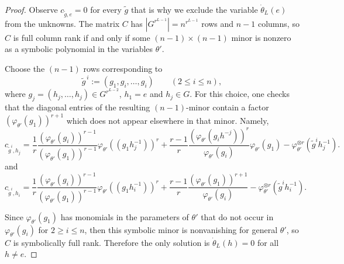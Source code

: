 \documentclass[final]{article}
\theoremstyle{definition}
\theoremstyle{plain}
\begin{document}
\begin{proof}
Observe $c_{\tilde g,e}=0$ for every $\tilde g$ that is why we exclude the variable $\dot{\theta}_L(e)$ from the unknowns. The matrix $C$ has $|G^{r^{L-1}}|=n^{r^{L-1}}$ rows and $n-1$ columns, so $C$ is full column rank if and only if some $(n-1)\times(n-1)$ minor is nonzero as a symbolic polynomial in the variables $\theta'$.

Choose the $(n-1)$ rows corresponding to
\[
\tilde g^{\,i}:=(g_1, g_i,\dots,g_i)\qquad(2\le i\le n),
\]
where $g_j=(h_j,\dots,h_j)\in G^{r^{L-2}}$, $h_1=e$ and $h_j \in G$. For this choice, one checks that the diagonal entries of the resulting $(n-1)$-minor contain a factor $(\varphi_{\theta'}(g_1))^{r+1}$ which does not appear elsewhere in that minor. 
Namely,
 \[
 c_{\tilde{g}^i, h_j} = \dfrac{1}{r}\dfrac{(\varphi_{\theta'}(g_i))^{r-1}}{(\varphi_{\theta'}(g_1))^{r-1}} \varphi_{\theta'}((g_1    h_j^{-1}))^r 
 + 
 \dfrac{r-1}{r}\dfrac{(\varphi_{\theta'}(g_i   h^{-j}))^r}{\varphi_{\theta'}(g_i)} \varphi_{\theta'}(g_1) 
 - 
 \varphi_{\theta'}^{\otimes r}(\tilde{g}^{i}    h_j^{-1}).
 \]
and 
 \[
 c_{\tilde{g}^i, h_i} = \dfrac{1}{r}\dfrac{(\varphi_{\theta'}(g_i))^{r-1}}{(\varphi_{\theta'}(g_1))^{r-1}} \varphi_{\theta'}((g_1    h_i^{-1}))^r 
 + 
 \dfrac{r-1}{r}\dfrac{(\varphi_{\theta'}(g_1))^{r+1}}{\varphi_{\theta'}(g_i)}
 - 
 \varphi_{\theta'}^{\otimes r}(\tilde{g}^{i}    h_i^{-1}).
 \]

Since $\varphi_{\theta'}(g_1)$ has monomials in the parameters of $\theta'$ that do not occur  in  $\varphi_{\theta'}(g_i)$ for $2 \geq i \leq n$, then this symbolic minor is nonvanishing for general $\theta'$, so $C$ is symbolically full rank. Therefore the only solution is $\dot\theta_L(h)=0$ for all $h\ne e$. 
\end{proof}
\end{document}
